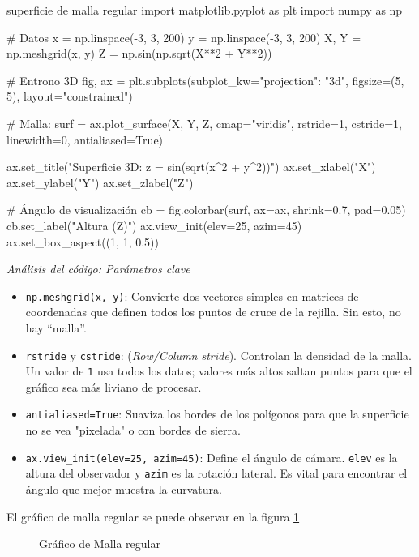 \begin{pycode}{superficie de malla regular}
import matplotlib.pyplot as plt
import numpy as np

# Datos
x = np.linspace(-3, 3, 200)
y = np.linspace(-3, 3, 200)
X, Y = np.meshgrid(x, y)
Z = np.sin(np.sqrt(X**2 + Y**2))

# Entrono 3D
fig, ax = plt.subplots(subplot_kw={"projection": "3d"}, figsize=(5, 5), layout="constrained")

# Malla:
surf = ax.plot_surface(X, Y, Z, cmap="viridis", rstride=1, cstride=1, linewidth=0, antialiased=True)

ax.set_title("Superficie 3D: z = sin(sqrt(x^2 + y^2))")
ax.set_xlabel("X")
ax.set_ylabel("Y")
ax.set_zlabel("Z")

# Ángulo de visualización
cb = fig.colorbar(surf, ax=ax, shrink=0.7, pad=0.05)
cb.set_label("Altura (Z)")
ax.view_init(elev=25, azim=45)
ax.set_box_aspect((1, 1, 0.5))   
\end{pycode}

\emph{Análisis del código: Parámetros clave}
\begin{itemize}
\item \texttt{np.meshgrid(x, y)}: Convierte dos vectores simples en matrices de coordenadas que definen todos los puntos de cruce de la rejilla. Sin esto, no hay ``malla''.
\item \texttt{rstride} y \texttt{cstride}: (\textit{Row/Column stride}). Controlan la densidad de la malla. Un valor de \texttt{1} usa todos los datos; valores más altos saltan puntos para que el gráfico sea más liviano de procesar.
\item \texttt{antialiased=True}: Suaviza los bordes de los polígonos para que la superficie no se vea "pixelada" o con bordes de sierra.
\item \texttt{ax.view\_init(elev=25, azim=45)}: Define el ángulo de cámara. \texttt{elev} es la altura del observador y \texttt{azim} es la rotación lateral. Es vital para encontrar el ángulo que mejor muestra la curvatura.
\end{itemize}

El gráfico de malla regular se puede observar en la figura \ref{fig:grafico_3D_malla_regular}

\begin{figure}[ht]
    \centering
     
    \caption{Gráfico de Malla regular}
    \label{fig:grafico_3D_malla_regular}
\end{figure}



